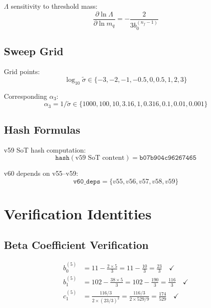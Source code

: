 \documentclass[11pt,a4paper]{article}
\theoremstyle{definition}
\begin{document}
$\Lambda$ sensitivity to threshold mass:
\begin{equation}
\label{eq:app-32}
\frac{\partial\ln\Lambda}{\partial\ln m_q} = -\frac{2}{3b_0^{(n_f-1)}}
\end{equation}

\subsection{Sweep Grid}
\label{subsec:app-sweep}

Grid points:
\begin{equation}
\label{eq:app-33}
\log_{10}\tilde{\sigma} \in \{-3, -2, -1, -0.5, 0, 0.5, 1, 2, 3\}
\end{equation}

Corresponding $\alpha_3$:
\begin{equation}
\label{eq:app-34}
\alpha_3 = 1/\tilde{\sigma} \in \{1000, 100, 10, 3.16, 1, 0.316, 0.1, 0.01, 0.001\}
\end{equation}

\subsection{Hash Formulas}
\label{subsec:app-hash}

v59 SoT hash computation:
\begin{equation}
\label{eq:app-35}
\texttt{hash}(\text{v59 SoT content}) = \texttt{b07b904c96267465}
\end{equation}

v60 depends on v55--v59:
\begin{equation}
\label{eq:app-36}
\texttt{v60\_deps} = \{v55, v56, v57, v58, v59\}
\end{equation}

\section{Verification Identities}
\label{app:verify}

\subsection{Beta Coefficient Verification}
\label{subsec:app-beta-verify}

\begin{align}
\label{eq:app-37}
b_0^{(5)} &= 11 - \frac{2 \times 5}{3} = 11 - \frac{10}{3} = \frac{23}{3} \quad \checkmark \\
\label{eq:app-38}
b_1^{(5)} &= 102 - \frac{38 \times 5}{3} = 102 - \frac{190}{3} = \frac{116}{3} \quad \checkmark \\
\label{eq:app-39}
c_1^{(5)} &= \frac{116/3}{2 \times (23/3)^2} = \frac{116/3}{2 \times 529/9} = \frac{174}{529} \quad \checkmark
\end{align}
\end{document}
